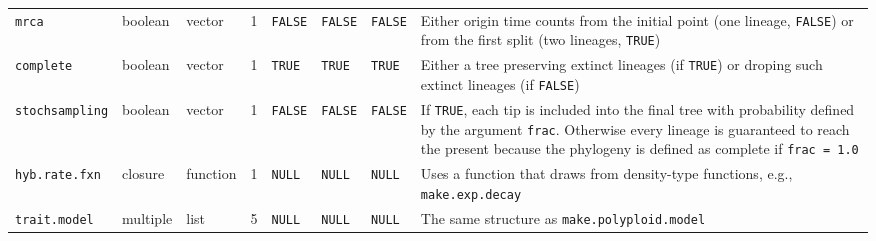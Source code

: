 \documentclass[]{article}
\begin{document}
\begin{small}
\begin{landscape}
\begin{longtable}[c]{p{2cm}p{1.2cm}p{1.2cm}p{1cm}p{2.6cm}p{2.6cm}p{2.6cm}p{5cm}}
\texttt{mrca} & boolean & vector & 1 & \texttt{FALSE} & \texttt{FALSE} & \texttt{FALSE} & Either origin time counts from the initial point (one lineage, \texttt{FALSE}) or from the first split (two lineages, \texttt{TRUE}) \\
\texttt{complete} & boolean & vector & 1 & \texttt{TRUE} & \texttt{TRUE} & \texttt{TRUE} & Either a tree preserving extinct lineages (if \texttt{TRUE}) or droping such extinct lineages (if \texttt{FALSE}) \\
\texttt{stochsampling} & boolean & vector & 1 & \texttt{FALSE} & \texttt{FALSE} & \texttt{FALSE} & If \texttt{TRUE}, each tip is included into the final tree with probability defined by the argument \texttt{frac}. Otherwise every lineage is guaranteed to reach the present because the phylogeny is defined as complete if \texttt{frac = 1.0} \\
\texttt{hyb.rate.fxn} & closure & function & 1 & \texttt{NULL} & \texttt{NULL} & \texttt{NULL} & Uses a function that draws from density-type functions, e.g., \texttt{make.exp.decay} \\
\texttt{trait.model} & multiple & list & 5 & \texttt{NULL} & \texttt{NULL} & \texttt{NULL} & The same structure as \texttt{make.polyploid.model}
\end{longtable}
\end{landscape}
\end{small}


\end{document}
